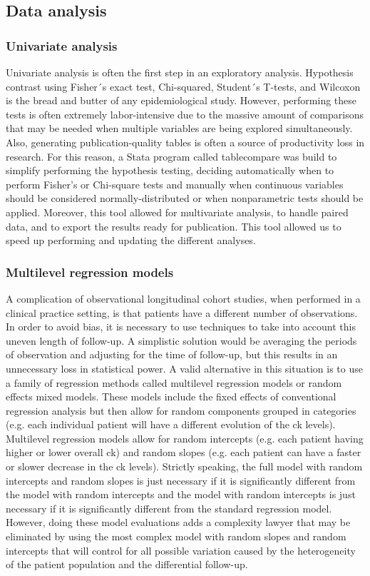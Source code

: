 \subsection{Data analysis}
\subsubsection{Univariate analysis}
Univariate analysis is often the first step in an exploratory analysis. Hypothesis contrast using Fisher´s exact test, Chi-squared, Student´s T-tests, and Wilcoxon is the bread and butter of any epidemiological study. However, performing these tests is often extremely labor-intensive due to the massive amount of comparisons that may be needed when multiple variables are being explored simultaneously. Also, generating publication-quality tables is often a source of productivity loss in research. For this reason, a Stata program called table\textunderscore compare was build to simplify performing the hypothesis testing, deciding automatically when to perform Fisher's or Chi-square tests and manually when continuous variables should be considered normally-distributed or when nonparametric tests should be applied. Moreover, this tool allowed for multivariate analysis, to handle paired data, and to export the results ready for publication. This tool allowed us to speed up performing and updating the different analyses.

\subsubsection{Multilevel regression models}
A complication of observational longitudinal cohort studies, when performed in a clinical practice setting, is that patients have a different number of observations. In order to avoid bias, it is necessary to use techniques to take into account this uneven length of follow-up. A simplistic solution would be averaging the periods of observation and adjusting for the time of follow-up, but this results in an unnecessary loss in statistical power. A valid alternative in this situation is to use a family of regression methods called multilevel regression models or random effects mixed models. These models include the fixed effects of conventional regression analysis but then allow for random components grouped in categories (e.g. each individual patient will have a different evolution of the \gls{ck} levels). Multilevel regression models allow for random intercepts (e.g. each patient having higher or lower overall \gls{ck}) and random slopes (e.g. each patient can have a faster or slower decrease in the \gls{ck} levels). Strictly speaking, the full model with random intercepts and random slopes is just necessary if it is significantly different from the model with random intercepts and the model with random intercepts is just necessary if it is significantly different from the standard regression model. However, doing these model evaluations adds a complexity lawyer that may be eliminated by using the most complex model with random slopes and random intercepts that will control for all possible variation caused by the heterogeneity of the patient population and the differential follow-up.

